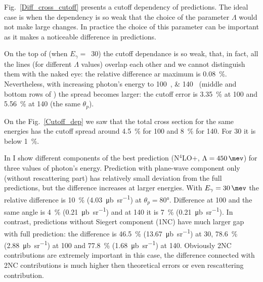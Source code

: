     Fig.~\ref{Diff_cross_cutoff} presents a cutoff dependency
    of predictions. The ideal case is when the dependency is so weak that
    the choice of the parameter $\Lambda$ would not make large 
    changes. In practice the choice of this parameter can be 
    important as it makes a noticeable difference in predictions.
    
    On the top of  (when $E_\gamma=$~\SI{30}{\mev}) the cutoff dependance is so weak,
    that, in fact, all the lines (for different $\Lambda$ values)
    overlap each other and we cannot distinguish them with the naked eye:
    the relative difference ar maximum is \SI{0.08}{\percent}.
    Nevertheless, with increasing photon's energy to \SIlist{100; 140}{\mev} 
    (middle and bottom rows of ) the spread becomes larger:
    the cutoff error is  \SI{3.35}{\percent} at \SI{100}{\mev}
    and \SI{5.56}{\percent} at \SI{140}{\mev} (the same $\theta_p$). 

    On the Fig.~\ref{Cutoff_dep} we saw that the total
    cross section for the same energies has the cutoff spread
    around \SI{4.5}{\percent} for \SI{100}{\mev} and \SI{8}{\percent} for \SI{140}{\mev}. For \SI{30}{\mev} it is below  \SI{1}{\percent}.
    
    In  I show different components of the best prediction (N$^4$LO+, $\Lambda=\SI{450}{\mev}$)
    for three values of photon's energy. Prediction with plane-wave component only (without rescattering part)
    has relatively small deviation from the full predictions, but the difference increases at larger energies.
    With $E_\gamma=\SI{30}{\mev}$ the relative difference is \SI{10}{\percent} (\SI{4.03}{\micro \barn \per \steradian})
    at $\theta_p = \ang{80}$. Difference at \SI{100}{\mev} and the same angle is \SI{4}{\percent} (\SI{0.21}{\micro \barn \per \steradian})
    and at \SI{140}{\mev} it is \SI{7}{\percent} (\SI{0.21}{\micro \barn \per \steradian}).
    In contrast, predictions without Siegert component (1NC) have much larger gap with full prediction:
    the difference is \SI{46.5}{\percent} (\SI{13.67}{\micro \barn \per \steradian}) at \SI{30}{\mev},
    \SI{78.6}{\percent} (\SI{2.88}{\micro \barn \per \steradian}) at \SI{100}{\mev} and
    \SI{77.8}{\percent} (\SI{1.68}{\micro \barn \per \steradian}) at \SI{140}{\mev}.
    Obviously 2NC contributions are extremely important in this case, the difference connected with 2NC
    contributions is much higher then theoretical errors or even rescattering contribution.



